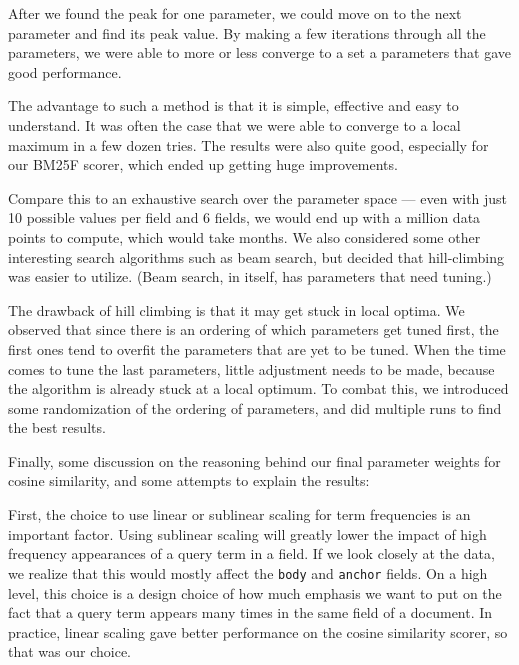 \documentclass[10pt,twocolumn]{article}
\begin{document}
After we found the peak for one parameter, we could move on to the next parameter and find its peak value. By making a few iterations through all the parameters, we were able to more or less converge to a set a parameters that gave good performance.

The advantage to such a method is that it is simple, effective and easy to understand. It was often the case that we were able to converge to a local maximum in a few dozen tries. The results were also quite good, especially for our BM25F scorer, which ended up getting huge improvements.

Compare this to an exhaustive search over the parameter space --- even with just 10 possible values per field and 6 fields, we would end up with a million data points to compute, which would take months. We also considered some other interesting search algorithms such as beam search, but decided that hill-climbing was easier to utilize. (Beam search, in itself, has parameters that need tuning.)

The drawback of hill climbing is that it may get stuck in local optima. We observed that since there is an ordering of which parameters get tuned first, the first ones tend to overfit the parameters that are yet to be tuned. When the time comes to tune the last parameters, little adjustment needs to be made, because the algorithm is already stuck at a local optimum. To combat this, we introduced some randomization of the ordering of parameters, and did multiple runs to find the best results.

Finally, some discussion on the reasoning behind our final parameter weights for cosine similarity, and some attempts to explain the results:

First, the choice to use linear or sublinear scaling for term frequencies is an important factor. Using sublinear scaling will greatly lower the impact of high frequency appearances of a query term in a field. If we look closely at the data, we realize that this would mostly affect the \texttt{body} and \texttt{anchor} fields. On a high level, this choice is a design choice of how much emphasis we want to put on the fact that a query term appears many times in the same field of a document. In practice, linear scaling gave better performance on the cosine similarity scorer, so that was our choice.
\end{document}
